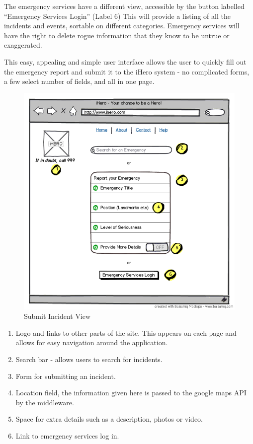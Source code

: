 \documentclass{sig-alt-release2}
\begin{document}
The emergency services have a different view, accessible by the button labelled “Emergency Services Login” (Label 6) This will provide a listing of all the incidents and events, sortable on different categories. Emergency services will have the right to delete rogue information that they know to be untrue or exaggerated.

This easy, appealing and simple user interface allows the user to quickly fill out the emergency report and submit it to the iHero system - no complicated forms, a few select number of fields, and all in one page.

\begin{figure}
  \caption{Submit Incident View}
  \begin{center}
    \includegraphics[scale=0.4]{img/1.png}
  \end{center}
\end{figure}

\begin{enumerate}
  \item Logo and links to other parts of the site. This appears on each page and allows for easy navigation around the application.
  \item Search bar - allows users to search for incidents.
  \item Form for submitting an incident.
  \item Location field, the information given here is passed to the google maps API by the middleware.
  \item Space for extra details such as a description, photos or video.
  \item Link to emergency services log in.
\end{enumerate}
\end{document}
